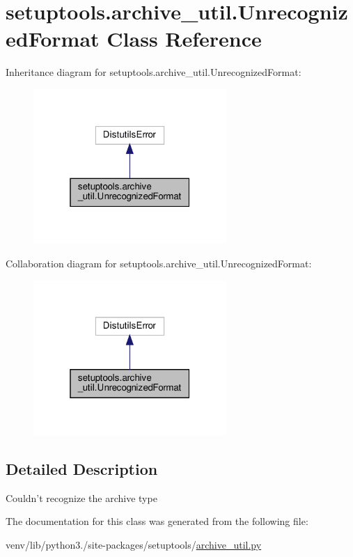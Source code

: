 \hypertarget{classsetuptools_1_1archive__util_1_1UnrecognizedFormat}{}\section{setuptools.\+archive\+\_\+util.\+Unrecognized\+Format Class Reference}
\label{classsetuptools_1_1archive__util_1_1UnrecognizedFormat}


Inheritance diagram for setuptools.\+archive\+\_\+util.\+Unrecognized\+Format\+:
\nopagebreak
\begin{figure}[H]
\begin{center}
\leavevmode
\includegraphics[width=208pt]{classsetuptools_1_1archive__util_1_1UnrecognizedFormat__inherit__graph}
\end{center}
\end{figure}


Collaboration diagram for setuptools.\+archive\+\_\+util.\+Unrecognized\+Format\+:
\nopagebreak
\begin{figure}[H]
\begin{center}
\leavevmode
\includegraphics[width=208pt]{classsetuptools_1_1archive__util_1_1UnrecognizedFormat__coll__graph}
\end{center}
\end{figure}


\subsection{Detailed Description}
\begin{DoxyVerb}Couldn't recognize the archive type\end{DoxyVerb}
 

The documentation for this class was generated from the following file\+:\begin{DoxyCompactItemize}
\item 
venv/lib/python3./site-\/packages/setuptools/\hyperlink{archive__util_8py}{archive\+\_\+util.\+py}\end{DoxyCompactItemize}
